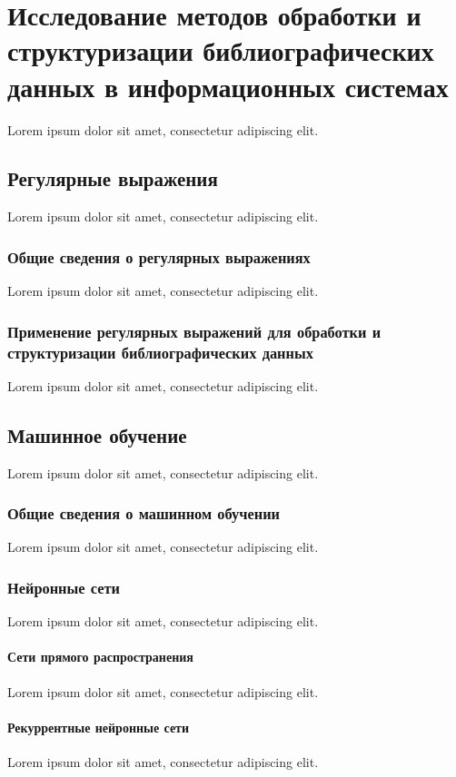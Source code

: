 \chapter{Исследование методов обработки и структуризации библиографических данных в информационных системах}
Lorem ipsum dolor sit amet, consectetur adipiscing elit.

\section{Регулярные выражения}
Lorem ipsum dolor sit amet, consectetur adipiscing elit.

\subsection{Общие сведения о регулярных выражениях}
Lorem ipsum dolor sit amet, consectetur adipiscing elit.

\subsection{Применение регулярных выражений для обработки и структуризации библиографических данных}
Lorem ipsum dolor sit amet, consectetur adipiscing elit.

\section{Машинное обучение}
Lorem ipsum dolor sit amet, consectetur adipiscing elit.

\subsection{Общие сведения о машинном обучении}
Lorem ipsum dolor sit amet, consectetur adipiscing elit.

\subsection{Нейронные сети}
Lorem ipsum dolor sit amet, consectetur adipiscing elit.

\subsubsection*{Сети прямого распространения}
Lorem ipsum dolor sit amet, consectetur adipiscing elit.

\subsubsection*{Рекуррентные нейронные сети}
Lorem ipsum dolor sit amet, consectetur adipiscing elit.

